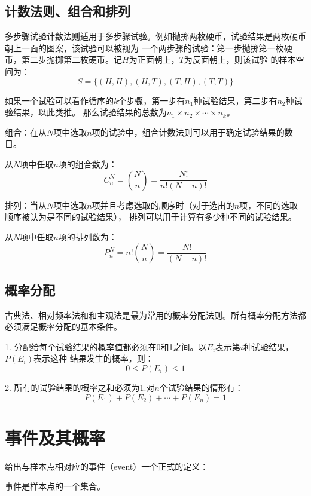 \documentclass[a4paper]{ctexrep}
\begin{document}
\subsection{计数法则、组合和排列}
多步骤试验计数法则适用于多步骤试验。例如抛掷两枚硬币，试验结果是两枚硬币朝上一面的图案，该试验可以被视为
一个两步骤的试验：第一步抛掷第一枚硬币，第二步抛掷第二枚硬币。记$H$为正面朝上，$T$为反面朝上，则该试验
的样本空间为：
\[S=\{(H,H),(H,T),(T,H),(T,T)\}\]
\begin{tcolorbox}[title = {多步骤试验计数法则}]
如果一个试验可以看作循序的$k$个步骤，第一步有$n_{1}$种试验结果，第二步有$n_{2}$种试验结果，以此类推。
那么试验结果的总数为$n_{1}\times n_{2}\times \cdots \times n_{k}$。
\end{tcolorbox}

组合：在从$N$项中选取$n$项的试验中，组合计数法则可以用于确定试验结果的数目。
\begin{tcolorbox}[title = {组合计数法则}]
从$N$项中任取$n$项的组合数为：
\[C^{N}_{n}=\binom{N}{n}=\frac{N!}{n!(N-n)!}\]
\end{tcolorbox}

排列：当从$N$项中选取$n$项并且考虑选取的顺序时（对于选出的$n$项，不同的选取顺序被认为是不同的试验结果），
排列可以用于计算有多少种不同的试验结果。
\begin{tcolorbox}[title = {排列计数法则}]
从$N$项中任取$n$项的排列数为：
\[P^{N}_{n}=n!\binom{N}{n}=\frac{N!}{(N-n)!}\]
\end{tcolorbox}

\subsection{概率分配}
古典法、相对频率法和和主观法是最为常用的概率分配法则。所有概率分配方法都必须满足概率分配的基本条件。
\begin{tcolorbox}[title = {概率分配的基本条件}]
1. 分配给每个试验结果的概率值都必须在0和1之间。以$E_{i}$表示第$i$种试验结果，$P(E_{i})$表示这种
结果发生的概率，则：
\[0 \leqslant P(E_{i}) \leqslant 1\]

2. 所有的试验结果的概率之和必须为1.对$n$个试验结果的情形有：
\[P(E_{1}) + P(E_{2}) + \cdots + P(E_{n}) = 1\]
\end{tcolorbox}


\section{事件及其概率}
给出与样本点相对应的事件（event）一个正式的定义：
\begin{tcolorbox}[title = {事件}]
事件是样本点的一个集合。
\end{tcolorbox}
\end{document}
